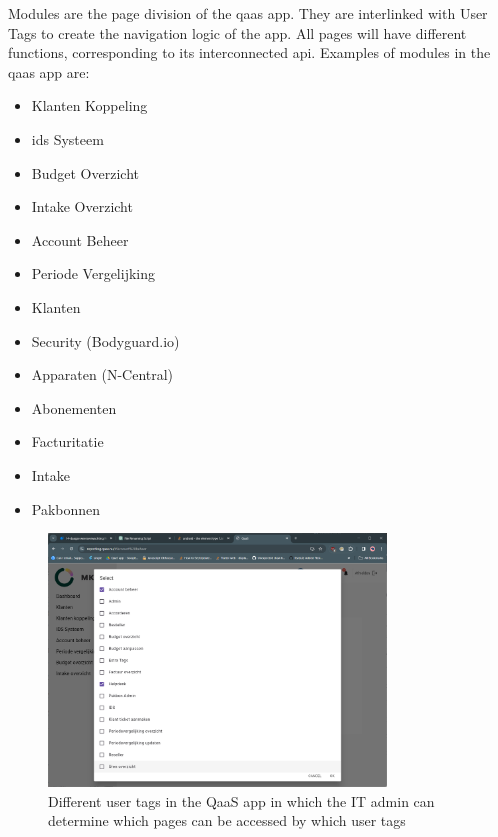 Modules are the page division of the \acrshort{qaas} app. They are interlinked with User Tags to create the navigation logic of the app.
All pages will have different functions, corresponding to its interconnected \acrshort{api}. Examples of modules in the \acrshort{qaas} app
are:

\begin{itemize}
      \item Klanten Koppeling
      \item \acrshort{ids} Systeem
      \item Budget Overzicht
      \item Intake Overzicht
      \item Account Beheer
      \item Periode Vergelijking
      \item Klanten
      \item Security (Bodyguard.io)
      \item Apparaten (N-Central)
      \item Abonementen
      \item Facturitatie
      \item Intake
      \item Pakbonnen
\end{itemize}


\begin{figure}[htbp]
      \centering
      \includegraphics[width=0.8\textwidth]{Figures/Qaas App/Modules/afbeelding (1).png}
      \caption{Different user tags in the QaaS app in which the IT admin can determine which pages can be accessed by which user tags}
      \label{fig:qaasAppModules}
\end{figure}

